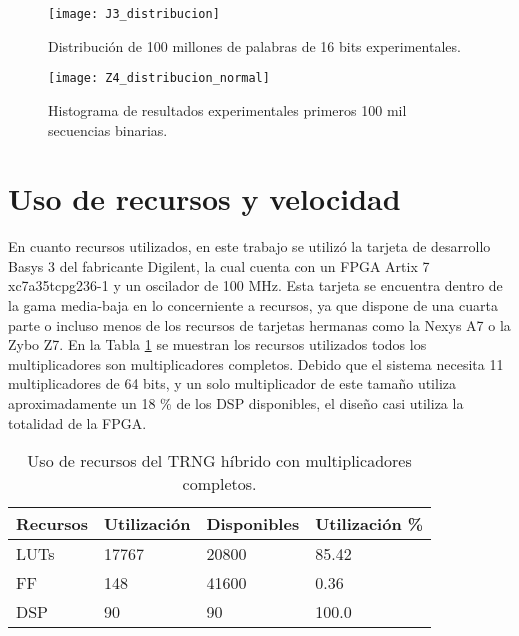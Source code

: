         \begin{figure}[hbtp]
            \caption{Distribución de 100 millones de palabras de 16 bits experimentales.}
            \centering
            \texttt{[image: J3\_distribucion]}
            \label{fig:J3_distribucion}
        \end{figure}


        \begin{figure}[hbtp]
            \caption{Histograma de resultados experimentales primeros 100 mil secuencias binarias.}
            \centering
            \texttt{[image: Z4\_distribucion\_normal]}
            \label{fig:J4_distribucion}
        \end{figure}



    \section{Uso de recursos y velocidad}

        En cuanto recursos utilizados, en este trabajo se utilizó la tarjeta de desarrollo Basys 3 del fabricante Digilent, la cual cuenta con un FPGA Artix 7 xc7a35tcpg236-1 y un oscilador de 100 MHz. Esta tarjeta se encuentra dentro de la gama media-baja en lo concerniente a recursos, ya que dispone de una cuarta parte o incluso menos de los recursos de tarjetas hermanas como la Nexys A7 o la Zybo Z7. En la Tabla \ref{tab:recursos} se muestran los recursos utilizados todos los multiplicadores son multiplicadores completos. Debido que el sistema necesita 11 multiplicadores de 64 bits, y un solo multiplicador de este tamaño utiliza aproximadamente un 18 \% de los DSP disponibles, el diseño casi utiliza la totalidad de la FPGA. 

        \begin{table}[htbp]
            \centering
            \caption{Uso de recursos del TRNG híbrido con multiplicadores completos.}
            \begin{tabular}{|l|l|l|l|}
                \hline
                \rowcolor{lightgray} Recursos  & Utilización & Disponibles & Utilización \% \\
                \hline
                LUTs      & 17767  & 20800    & 85.42  \\
                \hline
                FF     &  148 & 41600   & 0.36 \\
                \hline
                DSP       & 90  & 90   & 100.0 \\
                \hline
            \end{tabular}
            \label{tab:recursos}
        \end{table}

